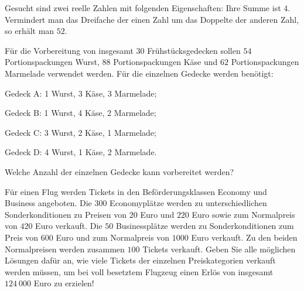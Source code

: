 \documentclass[11pt]{article}
\begin{document}
\begin{task}
	Gesucht sind zwei reelle Zahlen mit folgenden Eigenschaften: Ihre Summe ist $4$. Vermindert man das Dreifache der einen Zahl um das Doppelte der anderen Zahl, so erh\"alt man $52$.
\end{task}
\begin{task}
	F\"ur die Vorbereitung von insgesamt $30$ Fr\"uhst\"ucksgedecken sollen $54$ Portionspackungen Wurst, $88$ Portionspackungen K\"ase und $62$ Portionspackungen Marmelade verwendet werden. 
	F\"ur die einzelnen Gedecke werden ben\"otigt:
	
	Gedeck A: 1 Wurst, 3 K\"ase, 3 Marmelade;
	
	Gedeck B: 1 Wurst, 4 K\"ase, 2 Marmelade;
	
	Gedeck C: 3 Wurst, 2 K\"ase, 1 Marmelade;
	
	Gedeck D: 4 Wurst, 1 K\"ase, 2 Marmelade.
	
	Welche Anzahl der einzelnen Gedecke kann vorbereitet werden? 
\end{task}
\begin{task}
	F\"ur einen Flug werden Tickets in den Bef\"orderungsklassen Economy und Business angeboten.
	Die $300$ Economypl\"atze werden zu unterschiedlichen Sonderkonditionen zu Preisen von $20$ Euro und $220$ Euro sowie zum Normalpreis von $420$ Euro verkauft. Die $50$ Businesspl\"atze werden zu
	Sonderkonditionen zum Preis von $600$ Euro und zum Normalpreis von $1000$ Euro verkauft. Zu den beiden Normalpreisen werden zusammen $100$ Tickets verkauft.
	Geben Sie alle m\"oglichen L\"osungen daf\"ur an, wie viele Tickets der einzelnen Preiskategorien verkauft werden m\"ussen, um bei voll besetztem Flugzeug einen Erl\"os von insgesamt
	$124 \ 000$ Euro zu erzielen! 
\end{task}

\end{document}
